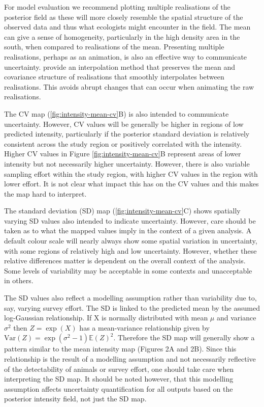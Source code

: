 \documentclass{stylefile16/statsoc}
\begin{document}
For model evaluation we recommend plotting multiple realisations of the posterior field as these will more closely resemble the spatial structure of the observed data and thus what ecologists might encounter in the field.  The mean can give a sense of homogeneity, particularly in the high density area in the south, when compared to realisations of the mean.  Presenting multiple realisations, perhaps as an animation, is also an effective way to communicate uncertainty. \cite{bowman_GraphicsUncertainty_2019a} provide an interpolation method that preserves the mean and covariance structure of realisations that smoothly interpolates between realisations.  This avoids abrupt changes that can occur when animating the raw realisations.  

The CV map (\autoref{fig:intensity-mean-cv}B) is also intended to communicate uncertainty.  However, CV values will be generally be higher in regions of low predicted intensity, particularly if the posterior standard deviation is relatively consistent across the study region or positively correlated with the intensity.  Higher CV values in Figure \ref{fig:intensity-mean-cv}B represent areas of lower intensity but not necessarily higher uncertainty.  However, there is also variable sampling effort within the study region, with higher CV values in the region with lower effort.  It is not clear what impact this has on the CV values and this makes the map hard to interpret.

The standard deviation (SD) map (\autoref{fig:intensity-mean-cv}C) shows spatially varying SD values also intended to indicate uncertainty.  However, care should be taken as to what the mapped values imply in the context of a given analysis.  A default colour scale will nearly always show some spatial variation in uncertainty, with some regions of relatively high and low uncertainty.  However, whether these relative differences matter is dependent on the overall context of the analysis.  Some levels of variability may be acceptable in some contexts and unacceptable in others.

The SD values also reflect a modelling assumption rather than variability due to, say, varying survey effort.  The SD is linked to the predicted mean by the assumed log-Gaussian relationship.  If X is normally distributed with mean $\mu$ and variance $\sigma^2$ then $Z = \exp(X)$ has a mean-variance relationship given by $\text{Var}(Z) = \exp(\sigma^2 - 1)\mathbb{E}(Z)^2$. Therefore the SD map will generally show a pattern similar to the mean intensity map (Figures 2A and 2B).  Since this relationship is the result of a modelling assumption and not necessarily reflective of the detectability of animals or survey effort, one should take care when interpreting the SD map.  It should be noted however, that this modelling assumption affects uncertainty quantification for all outputs based on the posterior intensity field, not just the SD map.
\end{document}
